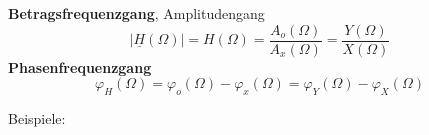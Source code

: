 \begin{multicols*}{2}
\raggedright
\textbf{Betragsfrequenzgang}, Amplitudengang
\[
|\underline{H}(\Omega)| = H(\Omega)=\frac{A_{o}(\Omega)}{A_{x}(\Omega)} = \frac{Y(\Omega)}{X(\Omega)}
\]
\textbf{Phasenfrequenzgang}
\[
\varphi_{H}(\Omega)=\varphi_{o}(\Omega)-\varphi_{x}(\Omega) =\varphi_{Y}(\Omega)-\varphi_{X}(\Omega)
\]

Beispiele:
\end{multicols*}
